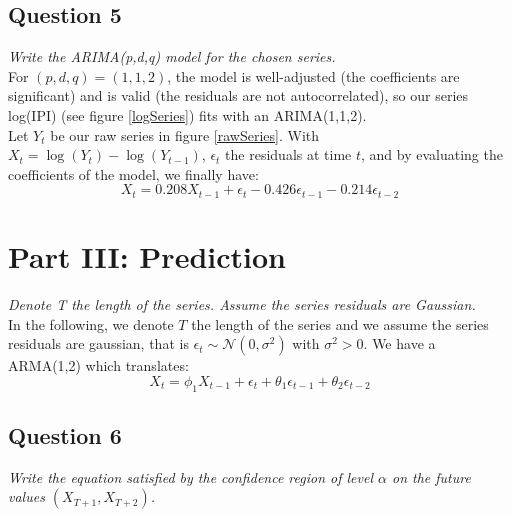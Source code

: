 \documentclass[]{article}
\begin{document}
\subsection{Question 5}
\textit{Write the ARIMA(p,d,q) model for the chosen series.}\\

For $(p, d, q) = (1, 1, 2)$, the model is well-adjusted (the coefficients are significant) and is valid (the residuals are not autocorrelated), so our series log(IPI) (see figure \ref{logSeries}) fits with an ARIMA(1,1,2).\\
Let $Y_t$ be our raw series in figure \ref{rawSeries}. With $X_t  = \log(Y_{t}) - \log(Y_{t-1})$, $\epsilon_t$ the residuals at time $t$, and by evaluating the coefficients of the model, we finally have:
\begin{equation}
	X_t = 0.208 X_{t-1} + \epsilon_t - 0.426 \epsilon_{t-1} - 0.214 \epsilon_{t-2}
\end{equation}


\section{Part III: Prediction}
\textit{Denote T the length of the series. Assume the series residuals are Gaussian.}\\

In the following, we denote $T$ the length of the series and we assume the series residuals are gaussian, that is $\epsilon_t \sim \mathcal{N}(0, \sigma^2)$ with $\sigma^2>0$. We have a ARMA(1,2) which translates:
\begin{equation}
	\label{arma12equation}
	X_t = \phi_1 X_{t-1} + \epsilon_t + \theta_1 \epsilon_{t-1}+ \theta_2 \epsilon_{t-2}
\end{equation}



\subsection{Question 6}
\textit{Write the equation satisfied by the confidence region of level $\alpha$ on the future values $(X_{T+1}, X_{T+2})$.}\\
\end{document}

